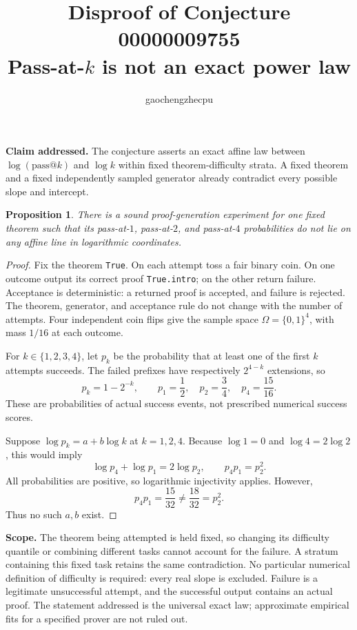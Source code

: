 \documentclass[11pt]{article}
\title{Disproof of Conjecture 00000009755\\Pass-at-$k$ is not an exact power law}
\author{gaochengzhecpu}
\date{}
\newtheorem{proposition}{Proposition}
\begin{document}
\maketitle
\noindent\textbf{Claim addressed.} The conjecture asserts an exact affine law between $\log(\mathrm{pass@}k)$ and $\log k$ within fixed theorem-difficulty strata. A fixed theorem and a fixed independently sampled generator already contradict every possible slope and intercept.

\begin{proposition}
There is a sound proof-generation experiment for one fixed theorem such that its pass-at-$1$, pass-at-$2$, and pass-at-$4$ probabilities do not lie on any affine line in logarithmic coordinates.
\end{proposition}
\begin{proof}
Fix the theorem \texttt{True}. On each attempt toss a fair binary coin. On one outcome output its correct proof \texttt{True.intro}; on the other return failure. Acceptance is deterministic: a returned proof is accepted, and failure is rejected. The theorem, generator, and acceptance rule do not change with the number of attempts. Four independent coin flips give the sample space $\Omega=\{0,1\}^4$, with mass $1/16$ at each outcome.

For $k\in\{1,2,3,4\}$, let $p_k$ be the probability that at least one of the first $k$ attempts succeeds. The failed prefixes have respectively $2^{4-k}$ extensions, so
\[
 p_k=1-2^{-k},\qquad
 p_1=\frac12,\quad p_2=\frac34,\quad p_4=\frac{15}{16}.
\]
These are probabilities of actual success events, not prescribed numerical success scores.

Suppose $\log p_k=a+b\log k$ at $k=1,2,4$. Because $\log1=0$ and $\log4=2\log2$, this would imply
\[
 \log p_4+\log p_1=2\log p_2,
 \qquad p_4p_1=p_2^2.
\]
All probabilities are positive, so logarithmic injectivity applies. However,
\[
 p_4p_1=\frac{15}{32}\ne\frac{18}{32}=p_2^2.
\]
Thus no such $a,b$ exist.
\end{proof}

\noindent\textbf{Scope.} The theorem being attempted is held fixed, so changing its difficulty quantile or combining different tasks cannot account for the failure. A stratum containing this fixed task retains the same contradiction. No particular numerical definition of difficulty is required: every real slope is excluded. Failure is a legitimate unsuccessful attempt, and the successful output contains an actual proof. The statement addressed is the universal exact law; approximate empirical fits for a specified prover are not ruled out.
\end{document}
